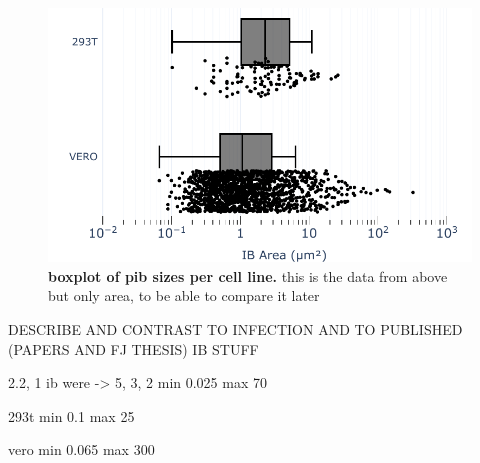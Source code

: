 \begin{figure}
    \centering
    \includegraphics[width=0.75\linewidth]{09. Chapter 4/Figs/01. pIB/01. pIB characterisation/03. box-pib.pdf}
    \caption[boxplot of pib sizes per cell line.]{\textbf{boxplot of pib sizes per cell line.} this is the data from above but only area, to be able to compare it later}
    \label{fig:boxplot of pib sizes per cell line}
\end{figure}

DESCRIBE AND CONTRAST TO INFECTION AND TO PUBLISHED (PAPERS AND FJ THESIS) IB STUFF

2.2, 1 
ib were -> 5, 3, 2 min 0.025 max 70

293t min 0.1 max 25

vero min 0.065 max 300

